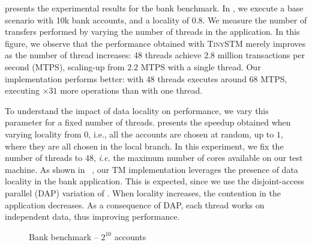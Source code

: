  presents the experimental results for the bank benchmark.
In , we execute a base scenario with 10k bank accounts, and a locality of 0.8.
We measure the number of transfers performed by varying the number of threads in the application.
In this figure, we observe that the performance obtained with \textsc{TinySTM} merely improves as the number of thread increases: 48 threads achieve $2.8$ million transactions per second (MTPS), scaling-up from $2.2$ MTPS with a single thread.
Our implementation performs better: with 48 threads  executes around 68 MTPS, executing $\times 31$ more operations than with one thread.

To understand the impact of data locality on performance, we vary this parameter for a fixed number of threads.
 presents the speedup obtained when varying locality from $0$, i.e., all the accounts are chosen at random, up to $1$, where they are all chosen in the local branch.
In this experiment, we fix the number of threads to $48$, \emph{i.e.} the maximum number of cores available on our test machine.
As shown in ~, our TM implementation leverages the presence of data locality in the bank application.
This is expected, since we use the disjoint-access parallel (DAP) variation of .
When locality increases, the contention in the application decreases.
As a consequence of DAP, each thread works on independent data, thus improving performance.

\begin{figure}[!t]
  \centering
  \caption{
    Bank benchmark -- $2^{10}$ accounts
  }
\end{figure}

